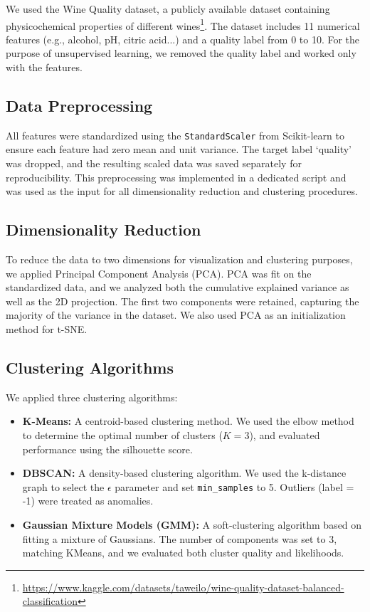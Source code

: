 \documentclass[12pt]{article}
\begin{document}
We used the Wine Quality dataset, a publicly available dataset containing physicochemical properties of different wines\footnote{\url{https://www.kaggle.com/datasets/taweilo/wine-quality-dataset-balanced-classification}}. The dataset includes 11 numerical features
(e.g., alcohol, pH, citric acid...) and a quality label from 0 to 10. For the purpose of unsupervised learning, we removed the quality label and worked only with the features.

\subsection*{Data Preprocessing}

All features were standardized using the \texttt{StandardScaler} from Scikit-learn to ensure each feature had zero mean and unit variance. The target label ‘quality’ was dropped, and the resulting scaled data was saved separately for reproducibility. This preprocessing was implemented in a dedicated script and was used as the input for all dimensionality reduction and clustering procedures.


\subsection*{Dimensionality Reduction}

To reduce the data to two dimensions for visualization and clustering purposes, we applied Principal Component Analysis (PCA). PCA was fit on the standardized data, and we analyzed both the cumulative explained variance as well as the 2D projection. The first two components were retained, capturing the majority of the variance in the dataset. We also used PCA as an initialization method for t-SNE.

\subsection*{Clustering Algorithms}

We applied three clustering algorithms:
\begin{itemize}
    \item \textbf{K-Means:} A centroid-based clustering method. We used the elbow method to determine the optimal number of clusters ($K=3$), and evaluated performance using the silhouette score.
    \item \textbf{DBSCAN:} A density-based clustering algorithm. We used the k-distance graph to select the $\epsilon$ parameter and set \texttt{min\_samples} to 5. Outliers (label = -1) were treated as anomalies.
    \item \textbf{Gaussian Mixture Models (GMM):} A soft-clustering algorithm based on fitting a mixture of Gaussians. The number of components was set to 3, matching KMeans, and we evaluated both cluster quality and likelihoods.
\end{itemize}
\end{document}
